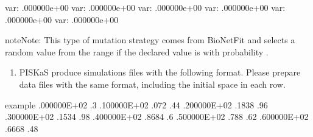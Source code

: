 \documentclass[letterpaper,10pt,english]{sphinxmanual}
\begin{document}
%
\begin{sphinxVerbatim}[commandchars=\\\{\}]
\PYGZpc{}var:  .000000e+00 
\PYGZpc{}var:  .000000e+00 
\PYGZpc{}var:  .000000e+00 
\PYGZpc{}var:  .000000e+00 
\PYGZpc{}var:  .000000e+00 
\PYGZpc{}var:  .000000e+00 
\end{sphinxVerbatim}

\begin{sphinxadmonition}{note}{Note:}
 This type of mutation strategy comes from BioNetFit and
selects a random value from the range 
if the declared value is  with probability .
\end{sphinxadmonition}
\begin{enumerate}
\def\theenumi{\arabic{enumi}}
\def\labelenumi{\theenumi .}
\makeatletter\def\p@enumii{\p@enumi \theenumi .}\makeatother
\setcounter{enumi}{1}
\item {} 

PISKaS produce simulations files with the following format. Please prepare
data files with the same format, including the initial space in each row.

\end{enumerate}

%
\begin{sphinxVerbatim}[commandchars=\\\{\}]
example   
 .000000E+02  .3
 .100000E+02 .072 .44
 .200000E+02 .1838 .96
 .300000E+02 .1534 .98
 .400000E+02 .8684 .6
 .500000E+02 .788 .62
 .600000E+02 .6668 .48
\end{sphinxVerbatim}
\end{document}
